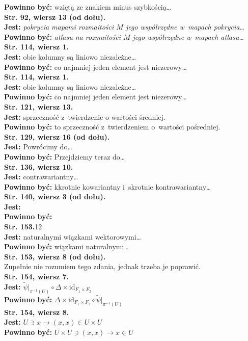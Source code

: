 \documentclass[a4paper,11pt]{article}
\newcommand{\mr}{\mathrm}
\newcommand{\ra}{\rightarrow}
\newcommand{\ld}{\ldots}
\newcommand{\ti}{\times}
\newcommand{\id}{\mr{id}}
\newcommand{\Del}{\Delta}
\newcommand{\wt}{\widetilde}
\newcommand{\tb}{\textbf}
\newcommand{\Str}[1]{\tb{Str. #1.}}
\newcommand{\StrWg}[2]{\tb{Str. #1, wiersz #2.}}
\newcommand{\StrWd}[2]{\tb{Str. #1, wiersz #2 (od dołu).}}
\newcommand{\Jest}{\tb{Jest: }}
\newcommand{\Pow}{\tb{Powinno być: }}
\begin{document}
\Pow  wziętą ze znakiem minus szybkością\ldots \\
\StrWd{92}{13} \\
\Jest \emph{pokrycia mapami rozmaitości $M$ jego współrzędne
  w~mapach pokrycia\ldots} \\
\Pow \emph{atlasu na rozmaitości $M$ jego współrzędne
  w~mapach atlasu\ldots} \\
\StrWg{114}{1} \\
\Jest obie kolumny są liniowo niezależne\ldots \\
\Pow  co najmniej jeden element jest niezerowy\ldots \\
\StrWg{114}{1} \\
\Jest obie kolumny są liniowo niezależne\ldots \\
\Pow  co najmniej jeden element jest niezerowy\ldots \\
\StrWg{121}{13} \\
\Jest sprzeczność z~twierdzenie o wartości średniej.\\
\Pow  to sprzeczność z~twierdzeniem o~wartości pośredniej.\\
\StrWd{129}{16} \\
\Jest Powrócimy do\ldots\\
\Pow  Przejdziemy teraz do\ldots\\
\StrWg{136}{10} \\
\Jest contrawariantny\ldots\\
\Pow  k\dywiz krotnie kowariantny i~s\dywiz krotnie kontrawariantny\ldots \\
\StrWd{140}{3} \\
\Jest \\
\Pow \\
\Str{153}{12} \\
\Jest naturalnymi wiązkami wektorowymi\ld \\
\Pow  wiązkami naturalnymi\ld \\
\StrWd{153}{8} \\
Zupełnie nie rozumiem tego zdania, jednak trzeba je poprawić. \\
\StrWg{154}{7} \\
\Jest $\wt{ \psi }\Big|_{ \pi^{ -1 }( U ) } \circ \Del \ti
\id_{ F_{ 1 } \ti F_{ 2 } }$ \\
\Pow $\Del \ti \id_{ F_{ 1 } \ti F_{ 2 } } \circ
\wt{ \psi }\Big|_{ \pi^{ -1 }( U ) }$ \\
\StrWg{154}{8} \\
\Jest $U \ni x \ra ( x, x ) \in U \ti U$ \\
\Pow $U \ti U \ni ( x, x ) \ra x \in U$ \\
\end{document}
